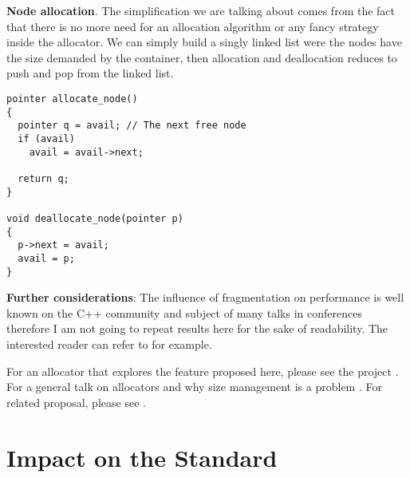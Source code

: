 \documentclass[11pt]{article}
\begin{document}
\noindent
{\bf Node allocation}.  The simplification we are talking about comes from the
fact that there is no more need for an allocation algorithm or any fancy
strategy inside the allocator. We can simply build a singly linked list were
the nodes have the size demanded by the container, then allocation and
deallocation reduces to push and pop from the linked list.

\medskip
\begin{lstlisting}
pointer allocate_node()
{
  pointer q = avail; // The next free node
  if (avail)
    avail = avail->next;

  return q;
}

void deallocate_node(pointer p)
{
  p->next = avail;
  avail = p;
}

\end{lstlisting}

\medskip
\noindent
{\bf Further considerations}: The influence of fragmentation on
performance is well known on the C++ community and subject of many
talks in conferences therefore I am not going to repeat results here
for the sake of readability. The interested reader can refer to
\cite{chandler, meyers} for example.

For an allocator that explores the feature proposed here, please see
the project \cite{rtcpp}. For a general
talk on allocators and why size management is a problem
\cite{alexandrescu}. For related proposal, please see \cite{prop1}.



\section{Impact on the Standard} \label{impact}
\end{document}
